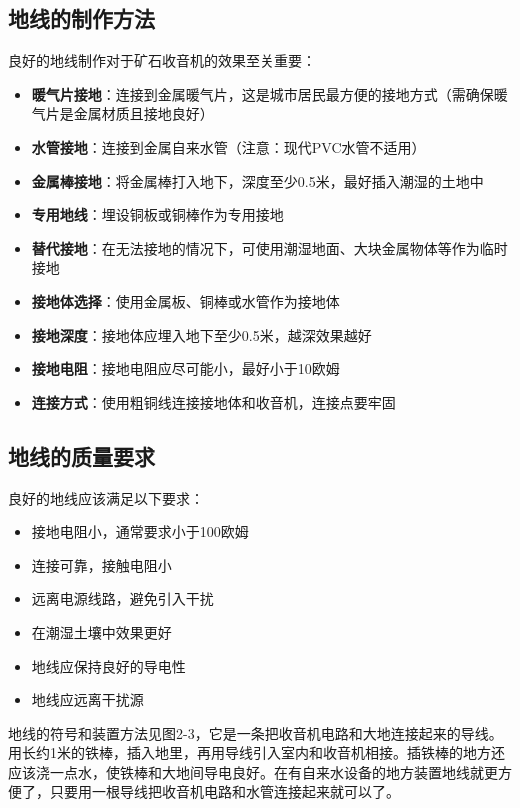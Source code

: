 \documentclass[12pt,UTF8]{ctexbook}
\begin{document}
\subsection{地线的制作方法}

良好的地线制作对于矿石收音机的效果至关重要：

\begin{itemize}[leftmargin=3.5em]
    \item \textbf{暖气片接地}：连接到金属暖气片，这是城市居民最方便的接地方式（需确保暖气片是金属材质且接地良好）
    \item \textbf{水管接地}：连接到金属自来水管（注意：现代PVC水管不适用）
    \item \textbf{金属棒接地}：将金属棒打入地下，深度至少0.5米，最好插入潮湿的土地中
    \item \textbf{专用地线}：埋设铜板或铜棒作为专用接地
    \item \textbf{替代接地}：在无法接地的情况下，可使用潮湿地面、大块金属物体等作为临时接地
    \item \textbf{接地体选择}：使用金属板、铜棒或水管作为接地体
    \item \textbf{接地深度}：接地体应埋入地下至少0.5米，越深效果越好
    \item \textbf{接地电阻}：接地电阻应尽可能小，最好小于10欧姆
    \item \textbf{连接方式}：使用粗铜线连接接地体和收音机，连接点要牢固
\end{itemize}

\subsection{地线的质量要求}

良好的地线应该满足以下要求：

\begin{itemize}[leftmargin=3.5em]
    \item 接地电阻小，通常要求小于100欧姆
    \item 连接可靠，接触电阻小
    \item 远离电源线路，避免引入干扰
    \item 在潮湿土壤中效果更好
    \item 地线应保持良好的导电性
    \item 地线应远离干扰源
\end{itemize}

地线的符号和装置方法见图2-3，它是一条把收音机电路和大地连接起来的导线。用长约1米的铁棒，插入地里，再用导线引入室内和收音机相接。插铁棒的地方还应该浇一点水，使铁棒和大地间导电良好。在有自来水设备的地方装置地线就更方便了，只要用一根导线把收音机电路和水管连接起来就可以了。
\end{document}
